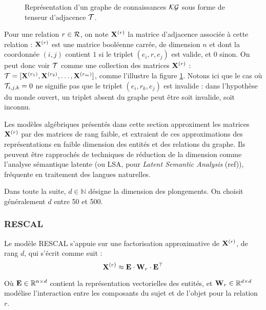\begin{figure}
    \centering
    
    \caption[Représentation de graphe sous forme de tenseur d'adjacence]{Représentation d'un graphe de connaissances $\KG$ sous forme de tenseur d'adjacence $\cal{T}$.}
    \label{fig:kge-algebric-overview}
\end{figure}

Pour une relation $r \in \Rel$, on note $\bf{X}^{(r)}$ la matrice d'adjacence associée à cette relation : $\bf{X}^{(r)}$ est une matrice booléenne carrée, de dimension $n$ et dont la coordonnée $(i, j)$ contient $1$ si le triplet $(e_i, r, e_j)$ est valide, et $0$ sinon. On peut donc voir $\cal{T}$ comme une collection des matrices $\bf{X}^{(r)}$ : $\cal{T} = [\bf{X}^{(r_1)}, \bf{X}^{(r_2)}, \ldots, \bf{X}^{(r_m)}]$, comme l'illustre la figure  \ref{fig:kge-algebric-overview}. Notons ici que le cas où $\cal{T}_{i, j, k} = 0$ ne signifie pas que le triplet $(e_i, r_k, e_j)$ est invalide : dans l'hypothèse du monde ouvert, un triplet absent du graphe peut être soit invalide, soit inconnu.

Les modèles algébriques présentés dans cette section approximent les matrices $\bf{X}^{(r)}$ par des matrices de rang faible, et extraient de ces approximations des représentations en faible dimension des entités et des relations du graphe. Ils peuvent être rapprochés de techniques de réduction de la dimension comme l'analyse sémantique latente (ou LSA, pour \textit{Latent Semantic Analysis} (ref)), fréquente en traitement des langues naturelles.

Dans toute la suite, $d \in \mathbb{N}$ désigne la dimension des plongements. On choisit généralement $d$ entre 50 et 500.

\subsubsection{RESCAL}

Le modèle RESCAL \cite{rescal} s'appuie sur une factorisation approximative de $\bf{X}^{(r)}$, de rang $d$, qui s'écrit comme suit  :
\begin{equation}
    \bf{X}^{(r)} \approx \bf{E} \cdot \bf{W}_r \cdot \bf{E}^\top
    \label{eq:kge-rescal-factorization}
\end{equation}

Où $\bf{E} \in \R^{n \times d}$ contient la représentation vectorielles des entités, et $\bf{W}_r \in \R^{d \times d}$ modélise l'interaction entre les composants du sujet et de l'objet pour la relation $r$.

